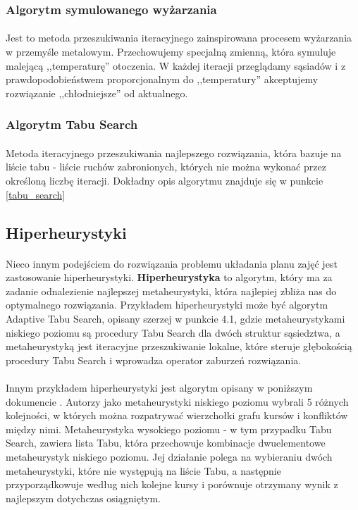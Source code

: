 \subsubsection{Algorytm symulowanego wyżarzania}
\paragraph{} Jest to metoda przeszukiwania iteracyjnego zainspirowana procesem wyżarzania w przemyśle metalowym. Przechowujemy specjalną zmienną, która symuluje malejącą ,,temperaturę'' otoczenia. W każdej iteracji przeglądamy sąsiadów i z prawdopodobieństwem proporcjonalnym do ,,temperatury'' akceptujemy rozwiązanie ,,chłodniejsze'' od aktualnego.

\subsubsection{Algorytm Tabu Search}
\paragraph{} Metoda iteracyjnego przeszukiwania najlepszego rozwiązania, która bazuje na liście tabu - liście ruchów zabronionych, których nie można wykonać przez określoną liczbę iteracji. Dokładny opis algorytmu znajduje się w punkcie \ref{tabu_search}

\subsection{Hiperheurystyki}
\paragraph{}Nieco innym podejściem do rozwiązania problemu układania planu zajęć jest zastosowanie hiperheurystyki. \textbf{Hiperheurystyka} to algorytm, który ma za zadanie odnalezienie najlepszej metaheurystyki, która najlepiej zbliża nas do optymalnego rozwiązania. Przykładem hiperheurystyki może być algorytm Adaptive Tabu Search, opisany szerzej w punkcie 4.1, gdzie metaheurystykami niskiego poziomu są procedury Tabu Search dla dwóch struktur sąsiedztwa, a metaheurystyką jest iteracyjne przeszukiwanie lokalne, które steruje głębokością procedury Tabu Search i wprowadza operator zaburzeń rozwiązania.
\paragraph{}Innym przykładem hiperheurystyki jest algorytm opisany w poniższym dokumencie \cite{gbhh}. Autorzy jako metaheurystyki niskiego poziomu wybrali 5 różnych kolejności, w których można rozpatrywać wierzchołki grafu kursów i konfliktów między nimi. Metaheurystyka wysokiego poziomu - w tym przypadku Tabu Search, zawiera lista Tabu, która przechowuje kombinacje dwuelementowe metaheurystyk niskiego poziomu. Jej działanie polega na wybieraniu dwóch metaheurystyki, które nie występują na liście Tabu, a następnie przyporządkowuje według nich kolejne kursy i porównuje otrzymany wynik z najlepszym dotychczas osiągniętym.


